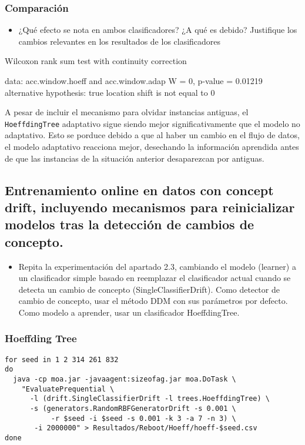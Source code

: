 \documentclass[11pt]{article}
\begin{document}
\subsubsection{Comparación}
\label{sec:orgcc235ad}
\begin{itemize}
\item ¿Qué efecto se nota en ambos clasificadores? ¿A qué es debido?
Justifique los cambios relevantes en los resultados de los
clasificadores
\end{itemize}


	Wilcoxon rank sum test with continuity correction

data:  acc.window.hoeff and acc.window.adap
W = 0, p-value = 0.01219
alternative hypothesis: true location shift is not equal to 0


A pesar de incluir el mecanismo para olvidar instancias antiguas, el
\texttt{HoeffdingTree} adaptativo sigue siendo mejor significativamente que
el modelo no adaptativo. Esto se porduce debido a que al haber un
cambio en el flujo de datos, el modelo adaptativo reacciona mejor,
desechando la información aprendida antes de que las instancias de la
situación anterior desaparezcan por antiguas.
\subsection{Entrenamiento online en datos con concept drift, incluyendo mecanismos para reinicializar modelos tras la detección de cambios de concepto.}
\label{sec:org05be011}

\begin{itemize}
\item Repita la experimentación del apartado 2.3, cambiando el modelo
(learner) a un clasificador simple basado en reemplazar el
clasificador actual cuando se detecta un cambio de concepto
(SingleClassifierDrift). Como detector de cambio de concepto, usar
el método DDM con sus parámetros por defecto. Como modelo a
aprender, usar un clasificador HoeffdingTree.
\end{itemize}

\subsubsection{Hoeffding Tree}
\label{sec:org9b293a1}
\begin{verbatim}
for seed in 1 2 314 261 832
do
  java -cp moa.jar -javaagent:sizeofag.jar moa.DoTask \
    "EvaluatePrequential \
      -l (drift.SingleClassifierDrift -l trees.HoeffdingTree) \
	  -s (generators.RandomRBFGeneratorDrift -s 0.001 \
	       -r $seed -i $seed -s 0.001 -k 3 -a 7 -n 3) \
       -i 2000000" > Resultados/Reboot/Hoeff/hoeff-$seed.csv
done
\end{verbatim}
\end{document}
